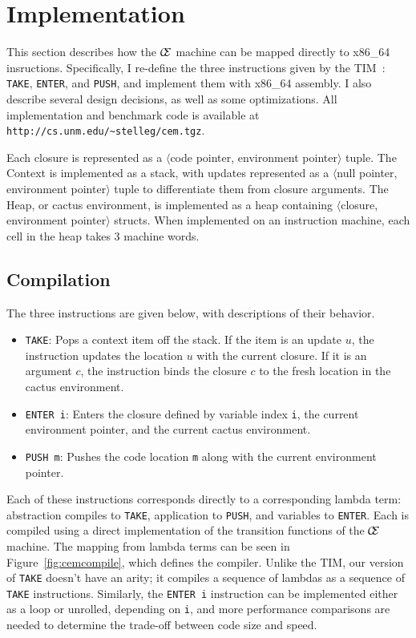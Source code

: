 \section{Implementation} \label{sec:impl}

This section describes how the $\mathcal{\mathcal{C} \mskip -4mu \mathcal{E}}$
machine can be mapped directly to x86\_64 insructions. Specifically, I re-define
the three instructions given by the TIM~\cite{TIM}: \texttt{TAKE},
\texttt{ENTER}, and \texttt{PUSH}, and implement them with x86\_64 assembly. I 
also describe several design decisions, as well as some optimizations. All
implementation and benchmark code is available at
\texttt{http://cs.unm.edu/\textasciitilde stelleg/cem.tgz}.

Each closure is represented as a $\langle$code pointer, environment
pointer$\rangle$ tuple. The
Context is implemented as a stack, with updates represented as a $\langle$null pointer,
environment pointer$\rangle$ tuple to differentiate them from closure arguments. The
Heap, or cactus environment, is implemented as a heap containing $\langle$closure,
environment pointer$\rangle$ structs. When implemented on an instruction
machine, each cell in the heap takes 3 machine words.

\subsection{Compilation}
The three instructions are given below, with descriptions of their behavior. 

\begin{itemize}
\item \texttt{TAKE}: Pops a context item off the stack. If the item is an
update $u$, the instruction updates the location $u$ with the current closure.
If it is an argument $c$, the instruction binds the closure $c$ to the fresh
location in the cactus environment.
\item \texttt{ENTER i}: Enters the closure defined by variable index \texttt{i},
the current environment pointer, and the current cactus environment.  \item
\texttt{PUSH m}: Pushes the code location \texttt{m} along with the
current environment pointer. 
\end{itemize}

Each of these instructions corresponds directly to a corresponding lambda term:
abstraction compiles to \texttt{TAKE}, application to \texttt{PUSH}, and
variables to \texttt{ENTER}. Each is compiled using a direct implementation of
the transition functions of the $\mathcal{\mathcal{C} \mskip -4mu \mathcal{E}}$
machine. The mapping from lambda terms can be seen in
Figure~\ref{fig:cemcompile}, which defines the compiler. Unlike the TIM, our
version of \texttt{TAKE} doesn't have an arity; it compiles a sequence of
lambdas as a sequence of \texttt{TAKE} instructions. Similarly, the
\texttt{ENTER i} instruction can be implemented either as a loop or unrolled,
depending on \texttt{i}, and more performance comparisons are needed to
determine the trade-off between code size and speed.


